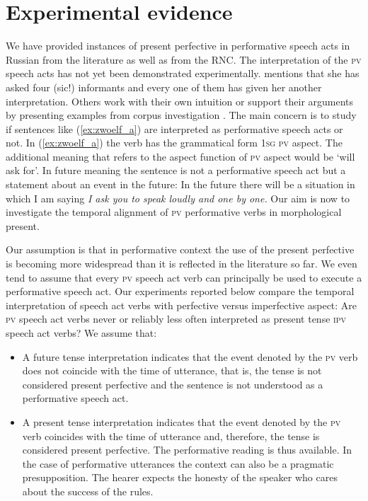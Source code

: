 \documentclass[output=paper,
colorlinks,
citecolor=brown,
newtxmath,
hidelinks
]{langscibook}
\begin{document}
\section{Experimental evidence}\label{sct:zwei}

We have provided instances of present perfective in performative speech acts in Russian from the literature as well as from the RNC. The interpretation of the \textsc{pv} speech acts has not yet been demonstrated experimentally. \citet{Rathmayr1976} mentions that she has asked four (sic!) informants and every one of them has given her another interpretation. Others work with their own intuition or support their arguments by presenting examples from corpus investigation \citep{Wiemer2014,Laczinski2014}. The main concern is to study if sentences like (\ref{ex:zwoelf_a}) are interpreted as performative speech acts or not. In (\ref{ex:zwoelf_a}) the verb has the grammatical form \textsc{1sg pv} aspect. The additional meaning that refers to the aspect function of \textsc{pv} aspect would be ‘will ask for’. In future meaning the sentence is not a performative speech act but a statement about an event in the future: In the future there will be a situation in which I am saying \textit{I ask you to speak loudly and one by one.} Our aim is now to investigate the temporal alignment of \textsc{pv} performative verbs in morphological present.

Our assumption is that in performative context the use of the present perfective is becoming more widespread than it is reflected in the literature so far. We even tend to assume that every \textsc{pv} speech act verb can principally be used to execute a performative speech act. Our experiments reported below compare the temporal interpretation of speech act verbs with perfective versus imperfective aspect: Are \textsc{pv} speech act verbs never or reliably less often interpreted as present tense \textsc{ipv} speech act verbs? We assume that:

\begin{itemize}
\item A future tense interpretation indicates that the event denoted by the \textsc{pv} verb does not coincide with the time of utterance, that is, the tense is not considered present perfective and the sentence is not understood as a performative speech act.
\item A present tense interpretation indicates that the event denoted by the \textsc{pv} verb coincides with the time of utterance and, therefore, the tense is considered present perfective. The performative reading is thus available. In the case of performative utterances the context can also be a pragmatic presupposition. The hearer expects the honesty of the speaker who cares about the success of the rules.
\end{itemize}
\end{document}
